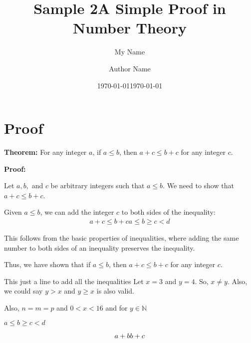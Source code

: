 \documentclass{article} %
\title{Sample 2} %
\author{My Name} %
\date{\today} %
\begin{document}
\title{A Simple Proof in Number Theory}
\author{Author Name}
\date{\today}
\maketitle

\section*{Proof}

\textbf{Theorem:} For any integer $a$, if $a \leq b$, then $a + c \leq b + c$ for any integer $c$.

\textbf{Proof:}

Let $a, b,$ and $c$ be arbitrary integers such that $a \leq b$. We need to show that $a + c \leq b + c$.

Given $a \leq b$, we can add the integer $c$ to both sides of the inequality:
\begin{equation}
    \begin{split}
        a + c \leq b + c
        a \leq b \geq c < d
    \end{split}
\end{equation}

This follows from the basic properties of inequalities, where adding the same number to both sides of an inequality preserves the inequality.

Thus, we have shown that if $a \leq b$, then $a + c \leq b + c$ for any integer $c$. \n

This just a line to add all the inequalities Let $x = 3$ and $y = 4$. So, $x \neq y$. Also, we could say $y > x$ and $y \geq x$ is also valid.

Also, $n = m = p$ and $0 < x < 16$ and for $ y \in \mathbb{N}$

$a \leq b \geq c < d$

$$a + b \\ b + c$$
\end{document}

